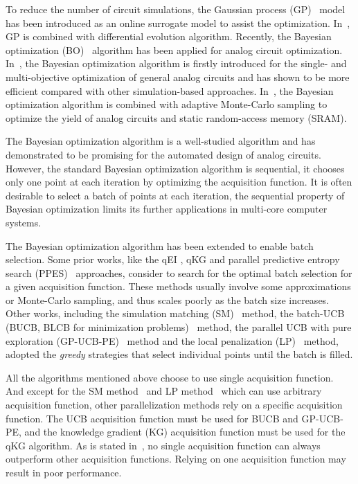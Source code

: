 %
To reduce the number of circuit simulations, the Gaussian process
(GP)~\cite{GPML} model has been introduced as an online surrogate model to
assist the optimization. In~\cite{liu2014gaspad}, GP is combined with
differential evolution algorithm. Recently, the
Bayesian optimization (BO)~\cite{shahriari2016taking} algorithm has been
applied for analog circuit optimization. In~\cite{lyu2017efficient}, the Bayesian optimization algorithm is
firstly introduced for the single- and multi-objective optimization of general analog circuits and has
shown to be more efficient compared with other simulation-based
approaches. In~\cite{wang2017efficient}, the Bayesian optimization algorithm
is combined with adaptive Monte-Carlo sampling to optimize the yield of analog
circuits and static random-access memory (SRAM).

The Bayesian optimization algorithm is a well-studied algorithm and has
demonstrated to be promising for the automated design of analog circuits.
However, the standard Bayesian optimization algorithm is sequential, it chooses
only one point at each iteration by optimizing the acquisition function. It is
often desirable to select a batch of points at each iteration, the sequential
property of Bayesian optimization limits its further applications in multi-core computer systems.

The Bayesian optimization algorithm has been extended to enable batch
selection. Some prior works, like the qEI \cite{qEI}, qKG \cite{wu2016parallel}
and parallel predictive entropy search (PPES)~\cite{shah2015parallel}
approaches, consider to search for the optimal batch selection for a given
acquisition function. These methods usually involve some approximations or
Monte-Carlo sampling, and thus scales poorly as the batch size increases. Other
works, including the simulation matching (SM)~\cite{azimi2010batch} method, the
batch-UCB (BUCB, BLCB for minimization
problems)~\cite{desautels2014parallelizing} method, the parallel UCB with pure
exploration (GP-UCB-PE)~\cite{contal2013parallel} method and the local
penalization (LP)~\cite{gonzalez2016batch} method, adopted the \emph{greedy}
strategies that select individual points until the batch is filled.

All the algorithms mentioned above choose to use single acquisition function.
And except for the SM method~\cite{azimi2010batch} and LP method~\cite{gonzalez2016batch} which can use arbitrary acquisition
function, other parallelization methods rely on a specific acquisition
function. The UCB acquisition function must be used for BUCB and GP-UCB-PE, and
the knowledge gradient (KG) acquisition function must be used for the qKG algorithm. As is stated
in~\cite{hoffman2011portfolio}, no single acquisition function can always
outperform other acquisition functions. Relying on one acquisition function may
result in poor performance.

